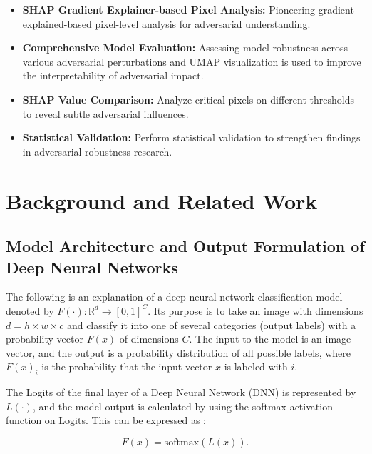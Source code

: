 \documentclass[10pt, conference, a4paper, final]{IEEEtran}
\begin{document}
\begin{itemize}
    \item \textbf{SHAP Gradient Explainer-based Pixel Analysis:} Pioneering gradient explained-based pixel-level analysis for adversarial understanding.
    
    \item \textbf{Comprehensive Model Evaluation:} Assessing model robustness across various adversarial perturbations and UMAP visualization is used to improve the interpretability of adversarial impact.
    
    \item \textbf{SHAP Value Comparison:} Analyze critical pixels on different thresholds to reveal subtle adversarial influences.
    
    \item \textbf{Statistical Validation:} Perform statistical validation to strengthen findings in adversarial robustness research.

\end{itemize}

\section{Background and Related Work}

\subsection{Model Architecture and Output Formulation of Deep Neural Networks}



The following is an explanation of a deep neural network classification model denoted by \( F(\cdot) : \mathbb{R}^d \rightarrow [0, 1]^{C} \). Its purpose is to take an image with dimensions \( d = h \times w \times c \) and classify it into one of several categories (output labels) with a probability vector \( F(x) \) of dimensions \( C \). The input to the model is an image vector, and the output is a probability distribution of all possible labels, where \( F(x)_i \)  is the probability that the input vector \( x \)  is labeled with \( i \). 

The Logits of the final layer of a Deep Neural Network (DNN) is represented by \(L(\cdot)\), and the model output is calculated by using the softmax activation function on Logits. This can be expressed as \cite {ZhangS.}:

\begin{equation}
    F(x) = \text{softmax}(L(x)).
    \end{equation}
\end{document}

